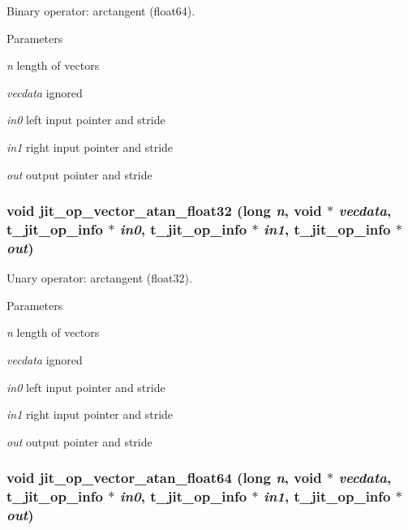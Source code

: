 Binary operator: arctangent (float64). 
\begin{DoxyParams}{Parameters}
\item[{\em n}]length of vectors \item[{\em vecdata}]ignored \item[{\em in0}]left input pointer and stride \item[{\em in1}]right input pointer and stride \item[{\em out}]output pointer and stride \end{DoxyParams}
\hypertarget{group__opvecmod_gaeb40d9e60bc56e3cb0b2c8c595320d29}{
\subsubsection[{jit\_\-op\_\-vector\_\-atan\_\-float32}]{\setlength{\rightskip}{0pt plus 5cm}void jit\_\-op\_\-vector\_\-atan\_\-float32 (long {\em n}, \/  void $\ast$ {\em vecdata}, \/  {\bf t\_\-jit\_\-op\_\-info} $\ast$ {\em in0}, \/  {\bf t\_\-jit\_\-op\_\-info} $\ast$ {\em in1}, \/  {\bf t\_\-jit\_\-op\_\-info} $\ast$ {\em out})}}
\label{group__opvecmod_gaeb40d9e60bc56e3cb0b2c8c595320d29}


Unary operator: arctangent (float32). 
\begin{DoxyParams}{Parameters}
\item[{\em n}]length of vectors \item[{\em vecdata}]ignored \item[{\em in0}]left input pointer and stride \item[{\em in1}]right input pointer and stride \item[{\em out}]output pointer and stride \end{DoxyParams}
\hypertarget{group__opvecmod_ga6b9d8110037905bd2f5be2634bcee094}{
\subsubsection[{jit\_\-op\_\-vector\_\-atan\_\-float64}]{\setlength{\rightskip}{0pt plus 5cm}void jit\_\-op\_\-vector\_\-atan\_\-float64 (long {\em n}, \/  void $\ast$ {\em vecdata}, \/  {\bf t\_\-jit\_\-op\_\-info} $\ast$ {\em in0}, \/  {\bf t\_\-jit\_\-op\_\-info} $\ast$ {\em in1}, \/  {\bf t\_\-jit\_\-op\_\-info} $\ast$ {\em out})}}
\label{group__opvecmod_ga6b9d8110037905bd2f5be2634bcee094}


